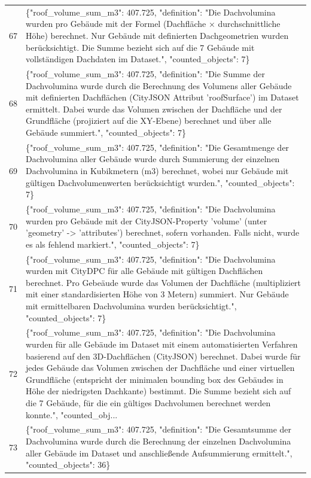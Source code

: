 \documentclass[a4paper,11pt]{article}
\begin{document}
\begin{table}[ht]
\begin{tabular}{r p{12cm}}
67 & \{"roof\_volume\_sum\_m3": 407.725, "definition": "Die Dachvolumina wurden pro Gebäude mit der Formel (Dachfläche × durchschnittliche Höhe) berechnet. Nur Gebäude mit definierten Dachgeometrien wurden berücksichtigt. Die Summe bezieht sich auf die 7 Gebäude mit vollständigen Dachdaten im Dataset.", "counted\_objects": 7\} \\
68 & \{"roof\_volume\_sum\_m3": 407.725, "definition": "Die Summe der Dachvolumina wurde durch die Berechnung des Volumens aller Gebäude mit definierten Dachflächen (CityJSON Attribut 'roofSurface') im Dataset ermittelt. Dabei wurde das Volumen zwischen der Dachfläche und der Grundfläche (projiziert auf die XY-Ebene) berechnet und über alle Gebäude summiert.", "counted\_objects": 7\} \\
69 & \{"roof\_volume\_sum\_m3": 407.725, "definition": "Die Gesamtmenge der Dachvolumina aller Gebäude wurde durch Summierung der einzelnen Dachvolumina in Kubikmetern (m3) berechnet, wobei nur Gebäude mit gültigen Dachvolumenwerten berücksichtigt wurden.", "counted\_objects": 7\} \\
70 & \{"roof\_volume\_sum\_m3": 407.725, "definition": "Die Dachvolumina wurden pro Gebäude mit der CityJSON-Property 'volume' (unter 'geometry' -> 'attributes') berechnet, sofern vorhanden. Falls nicht, wurde es als fehlend markiert.", "counted\_objects": 7\} \\
71 & \{"roof\_volume\_sum\_m3": 407.725, "definition": "Die Dachvolumina wurden mit CityDPC für alle Gebäude mit gültigen Dachflächen berechnet. Pro Gebeäude wurde das Volumen der Dachfläche (multipliziert mit einer standardisierten Höhe von 3 Metern) summiert. Nur Gebäude mit ermittelbaren Dachvolumina wurden berücksichtigt.", "counted\_objects": 7\} \\
72 & \{"roof\_volume\_sum\_m3": 407.725, "definition": "Die Dachvolumina wurden für alle Gebäude im Dataset mit einem automatisierten Verfahren basierend auf den 3D-Dachflächen (CityJSON) berechnet. Dabei wurde für jedes Gebäude das Volumen zwischen der Dachfläche und einer virtuellen Grundfläche (entspricht der minimalen bounding box des Gebäudes in Höhe der niedrigsten Dachkante) bestimmt. Die Summe bezieht sich auf die 7 Gebäude, für die ein gültiges Dachvolumen berechnet werden konnte.", "counted\_obj... \\
73 & \{"roof\_volume\_sum\_m3": 407.725, "definition": "Die Gesamtsumme der Dachvolumina wurde durch die Berechnung der einzelnen Dachvolumina aller Gebäude im Dataset und anschließende Aufsummierung ermittelt.", "counted\_objects": 36\} \\

\end{tabular}
\end{table}
\end{document}

